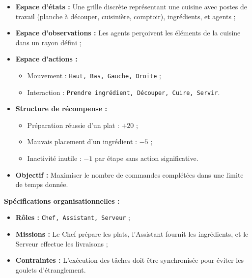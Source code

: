 \begin{itemize}
    \item \textbf{Espace d'états :} Une grille discrète représentant une cuisine avec postes de travail (planche à découper, cuisinière, comptoir), ingrédients, et agents ;
    \item \textbf{Espace d'observations :} Les agents perçoivent les éléments de la cuisine dans un rayon défini ;
    \item \textbf{Espace d'actions :}
          \begin{itemize}
              \item Mouvement : \texttt{Haut, Bas, Gauche, Droite} ;
              \item Interaction : \texttt{Prendre ingrédient, Découper, Cuire, Servir}.
          \end{itemize}
    \item \textbf{Structure de récompense :}
          \begin{itemize}
              \item Préparation réussie d'un plat : $+20$ ;
              \item Mauvais placement d'un ingrédient : $-5$ ;
              \item Inactivité inutile : $-1$ par étape sans action significative.
          \end{itemize}
    \item \textbf{Objectif :} Maximiser le nombre de commandes complétées dans une limite de temps donnée.
\end{itemize}

\textbf{Spécifications organisationnelles :}
\begin{itemize}
    \item \textbf{Rôles :} \texttt{Chef, Assistant, Serveur} ;
    \item \textbf{Missions :} Le Chef prépare les plats, l'Assistant fournit les ingrédients, et le Serveur effectue les livraisons ;
    \item \textbf{Contraintes :} L'exécution des tâches doit être synchronisée pour éviter les goulets d'étranglement.
\end{itemize}

